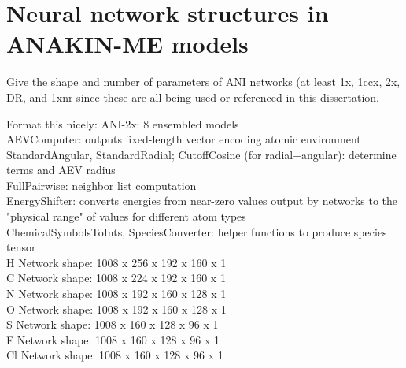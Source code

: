 \chapter{Neural network structures in ANAKIN-ME models}

Give the shape and number of parameters of ANI networks (at least 1x, 1ccx, 2x, DR, and 1xnr since these are all being used or referenced in this dissertation. 

Format this nicely:
ANI-2x: 8 ensembled models \\
AEVComputer: outputs fixed-length vector encoding atomic environment \\
StandardAngular, StandardRadial; CutoffCosine (for radial+angular): determine terms and AEV radius \\
FullPairwise: neighbor list computation\\
EnergyShifter: converts energies from near-zero values output by networks to the "physical range" of values for different atom types \\
ChemicalSymbolsToInts, SpeciesConverter: helper functions to produce species tensor \\
H Network shape: 1008 x 256 x 192 x 160 x 1 \\
C Network shape: 1008 x 224 x 192 x 160 x 1 \\
N Network shape: 1008 x 192 x 160 x 128 x 1 \\
O Network shape: 1008 x 192 x 160 x 128 x 1 \\
S Network shape: 1008 x 160 x 128 x 96 x 1 \\
F Network shape: 1008 x 160 x 128 x 96 x 1 \\
Cl Network shape: 1008 x 160 x 128 x 96 x 1 \\


